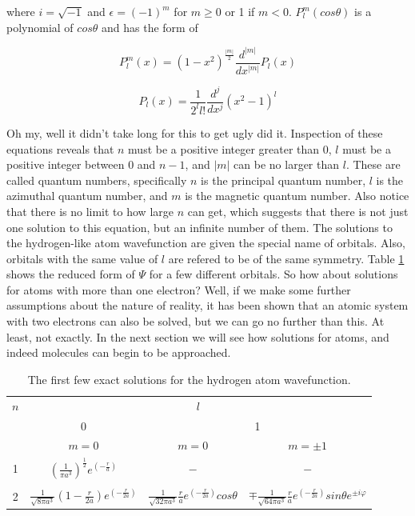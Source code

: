 \documentclass[12pt]{report}
\begin{document}
where $i=\sqrt{-1}$ and $\epsilon = (-1)^{m}$ for $m \geq 0$ or 1 if  $m < 0$. $P^{m}_{l}(cos\theta)$ is a polynomial of $cos\theta$ and has the form of

\begin{equation}
\label{eq:wavehydro_Y2}
P^{m}_{l}(x) = (1 - x^{2})^{\frac{|m|}{2}}\frac{d^{|m|}}{dx^{|m|}}P_{l}(x)
\end{equation}

\begin{equation}
\label{eq:wavehydro_Y3}
P_{l}(x) = \frac{1}{2^{l}l!}\frac{d^{j}}{dx^{j}}(x^{2}-1)^{l}
\end{equation} 

Oh my, well it didn't take long for this to get ugly did it. Inspection of these equations reveals that $n$ must be a positive integer greater than 0, $l$ must be a positive integer between 0 and $n-1$, and $|m|$ can be no larger than $l$. These are called quantum numbers, specifically $n$ is the principal quantum number, $l$ is the azimuthal quantum number, and $m$ is the magnetic quantum number. Also notice that there is no limit to how large $n$ can get, which suggests that there is not just one solution to this equation, but an infinite number of them. The solutions to the hydrogen-like atom wavefunction are given the special name of orbitals. Also, orbitals with the same value of $l$ are refered to be of the same symmetry. Table \ref{tab:hsol} shows the reduced form of $\Psi$ for a few different orbitals. So how about solutions for atoms with more than one electron? Well, if we make some further assumptions about the nature of reality, it has been shown that an atomic system with two electrons can also be solved\cite{harmonium}, but we can go no further than this. At least, not exactly. In the next section we will see how solutions for atoms, and indeed molecules can begin to be approached.

\begin{table}[h!]
\caption{The first few exact solutions for the hydrogen atom wavefunction.}
\label{tab:hsol}
\centering
\begin{tabular}{cccc}
\toprule
$n$	&	\multicolumn{3}{c}{$l$}	\\
\cmidrule(lr){1-1} \cmidrule(lr){2-4}
				&	0		&	\multicolumn{2}{c}{1}	\\ 
					\cmidrule(lr){2-2} \cmidrule(lr){3-4}
				&	$m=0$	&	$m=0$	&	$m=\pm1$	\\
\midrule
1	&	$\displaystyle\left(\frac{1}{\pi a^{3}}\right)^{\frac{1}{2}}e^{\left(-\frac{r}{a}\right)}$			&	$-$	&	$-$	\\
\\
2	&	$\displaystyle\frac{1}{\sqrt{8\pi a^{3}}}\left(1-\frac{r}{2a}\right)e^{\left(-\frac{r}{2a}\right)}$	&	$\displaystyle\frac{1}{\sqrt{32\pi a^{3}}}\frac{r}{a}e^{\left(-\frac{r}{2a}\right)}cos\theta $	&	
$\displaystyle\mp\frac{1}{\sqrt{64\pi a^{3}}}\frac{r}{a}e^{\left(-\frac{r}{2a}\right)}sin\theta e^{\pm i \varphi}$	\\
\bottomrule
\end{tabular}
\end{table}
\end{document}
